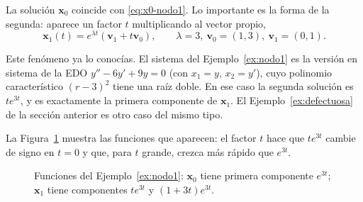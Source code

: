 La soluci\'on $\mathbf{x}_0$ coincide con \eqref{eq:x0-nodo1}. Lo importante es la forma de la segunda: aparece un factor $t$ multiplicando al vector propio,
\[
\mathbf{x}_1(t) = e^{\lambda t}(\mathbf{v}_1 + t\mathbf{v}_0), \qquad \lambda=3,\ \mathbf v_0=(1,3),\ \mathbf v_1=(0,1).
\]

\begin{remark}
Este fen\'omeno ya lo conoc\'ias. El sistema del Ejemplo~\ref{ex:nodo1} es la versi\'on en sistema de la EDO $y''-6y'+9y=0$ (con $x_1=y$, $x_2=y'$), cuyo polinomio caracter\'istico $(r-3)^2$ tiene una ra\'iz doble. En ese caso la segunda soluci\'on es $te^{3t}$, y es exactamente la primera componente de $\mathbf x_1$. El Ejemplo~\ref{ex:defectuosa} de la secci\'on anterior es otro caso del mismo tipo.
\end{remark}

La Figura~\ref{fig:te-comp} muestra las funciones que aparecen: el factor $t$ hace que $te^{3t}$ cambie de signo en $t=0$ y que, para $t$ grande, crezca m\'as r\'apido que $e^{3t}$.

\begin{figure}[H]
\centering
{}
\caption{Funciones del Ejemplo~\ref{ex:nodo1}: $\mathbf x_0$ tiene primera componente $e^{3t}$; $\mathbf x_1$ tiene componentes $te^{3t}$ y $(1+3t)e^{3t}$.}
\label{fig:te-comp}
\end{figure}

